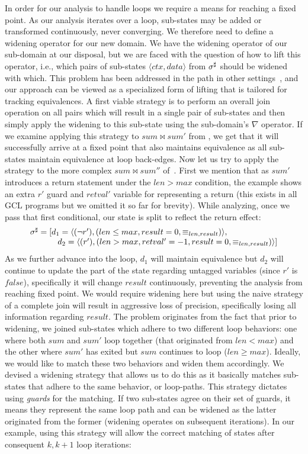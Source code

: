 In order for our analysis to handle loops we require a means for reaching a fixed point. As our analysis iterates over a loop, sub-states may be added or transformed continuously, never converging. We therefore need to define a widening operator for our new domain. We have the widening operator of our sub-domain at our disposal, but we are faced with the question of how to lift this  operator, i.e., which pairs of sub-states $\langle ctx , data \rangle$ from $\sigma^\sharp$ should be widened with which. 
This problem has been addressed in the path in other settings~\cite{Bagnara:2006}, and our approach can be viewed as a specialized form of lifting that is tailored for tracking equivalences. A first viable strategy is to perform an overall join operation on all pairs which will result in a single pair of sub-states and then simply apply the widening to this sub-state using the sub-domain's $\nabla$ operator. If we examine applying this strategy to $sum \bowtie sum'$ from , we get that it will successfully arrive at a fixed point that also maintains equivalence as all sub-states maintain equivalence at loop back-edges. Now let us try to apply the strategy to the more complex $sum \bowtie sum''$ of~. First we mention that as $sum'$ introduces a return statement under the $len > max$ condition, the example shows an extra $r'$ guard and $retval'$ variable for representing a return (this exists in all GCL programs but we omitted it so far for brevity). While analyzing, once we pass that first conditional, our state is split to reflect the return effect:
{\footnotesize
\[
\begin{array}{l}
\sigma^\sharp = [ d_1 = \langle (\neg r'),(len \leq max, result = 0, \equiv_{len,result}) \rangle, \\
~~~~~~~~~~d_2 = \langle (r'),(len > max, retval' = -1, result = 0, \equiv_{len,result}) \rangle ]
\end{array}
\]
}
As we further advance into the loop, $d_1$ will maintain equivalence but $d_2$ will continue to update the part of the state regarding untagged variables  (since $r'$ is $false$), specifically it will change $result$ continuously, preventing the analysis from reaching fixed point. We would require widening here but using the naive strategy of a complete join will result in aggressive loss of precision, specifically losing all information regarding $result$. The problem originates from the fact that prior to widening, we joined sub-states which adhere to two different loop behaviors: one where both $sum$ and $sum'$ loop together (that originated from $len < max$) and the other where $sum'$ has exited but $sum$ continues to loop ($len \geq max$). Ideally, we would like to match these two behaviors and widen them accordingly. We devised a widening strategy that allows us to do this as it basically matches sub-states that adhere to the same behavior, or loop-paths. This strategy dictates using \emph{guards} for the matching. If two sub-states agree on their set of guards, it means they represent the same loop path and can be widened as the latter originated from the former (widening operates on subsequent iterations). In our example, using this strategy will allow the correct matching of states after consequent $k, k+1$ loop iterations:
